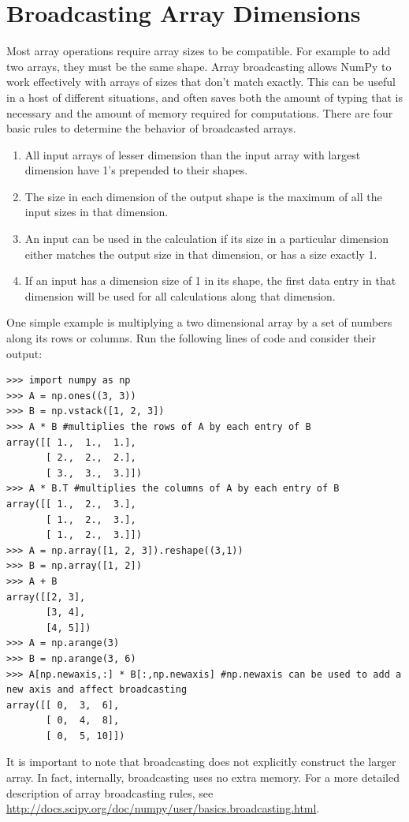 \section*{Broadcasting Array Dimensions}
Most array operations require array sizes to be compatible.
For example to add two arrays, they must be the same shape.
Array broadcasting allows NumPy to work effectively with arrays of sizes that don't match exactly.
This can be useful in a host of different situations, and often saves both the
amount of typing that is necessary and the amount of memory required for computations.
There are four basic rules to determine the behavior of broadcasted arrays.
\begin{enumerate}
\item All input arrays of lesser dimension than the input array with largest dimension have 1's prepended to their shapes.
\item The size in each dimension of the output shape is the maximum of all the input sizes in that dimension.
\item An input can be used in the calculation if its size in a particular dimension either matches the output size in that dimension, or has a size exactly 1.
\item If an input has a dimension size of 1 in its shape, the first data entry in that dimension will be used for all calculations along that dimension.
\end{enumerate}

One simple example is multiplying a two dimensional array by a set of numbers along its rows or columns.
Run the following lines of code and consider their output:
\begin{lstlisting}
>>> import numpy as np
>>> A = np.ones((3, 3))
>>> B = np.vstack([1, 2, 3])
>>> A * B #multiplies the rows of A by each entry of B
array([[ 1.,  1.,  1.],
       [ 2.,  2.,  2.],
       [ 3.,  3.,  3.]])
>>> A * B.T #multiplies the columns of A by each entry of B
array([[ 1.,  2.,  3.],
       [ 1.,  2.,  3.],
       [ 1.,  2.,  3.]])
>>> A = np.array([1, 2, 3]).reshape((3,1))
>>> B = np.array([1, 2])
>>> A + B
array([[2, 3],
       [3, 4],
       [4, 5]])
>>> A = np.arange(3)
>>> B = np.arange(3, 6)
>>> A[np.newaxis,:] * B[:,np.newaxis] #np.newaxis can be used to add a new axis and affect broadcasting
array([[ 0,  3,  6],
       [ 0,  4,  8],
       [ 0,  5, 10]])
\end{lstlisting}
It is important to note that broadcasting does not explicitly construct the larger array.
In fact, internally, broadcasting uses no extra memory.
For a more detailed description of array broadcasting rules, see \url{http://docs.scipy.org/doc/numpy/user/basics.broadcasting.html}.

